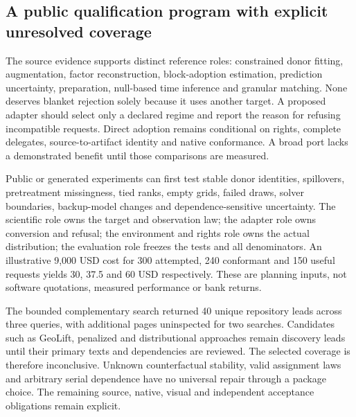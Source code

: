 \subsection{A public qualification program with explicit unresolved coverage}
The source evidence supports distinct reference roles: constrained donor
fitting, augmentation, factor reconstruction, block-adoption estimation,
prediction uncertainty, preparation, null-based time inference and granular
matching. None deserves blanket rejection solely because it uses another
target. A proposed adapter should select only a declared regime and report
the reason for refusing incompatible requests. Direct adoption remains
conditional on rights, complete delegates, source-to-artifact identity and
native conformance. A broad port lacks a demonstrated benefit until those
comparisons are measured.~\citep{exec25_synthr_choice}

Public or generated experiments can first test stable donor identities,
spillovers, pretreatment missingness, tied ranks, empty grids, failed draws,
solver boundaries, backup-model changes and dependence-sensitive uncertainty.
The scientific role owns the target and observation law; the adapter role
owns conversion and refusal; the environment and rights role owns the actual
distribution; the evaluation role freezes the tests and all denominators.
An illustrative 9,000 USD cost for 300 attempted, 240 conformant and 150 useful
requests yields 30, 37.5 and 60 USD respectively. These are planning inputs,
not software quotations, measured performance or bank returns.
\citep{exec25_synthr_choice}

The bounded complementary search returned 40 unique repository leads across
three queries, with additional pages uninspected for two searches. Candidates
such as GeoLift, penalized and distributional approaches remain discovery
leads until their primary texts and dependencies are reviewed. The selected
coverage is therefore inconclusive. Unknown counterfactual stability, valid
assignment laws and arbitrary serial dependence have no universal repair
through a package choice. The remaining source, native, visual and independent
acceptance obligations remain explicit.~\citep{exec25_synthr_choice}
